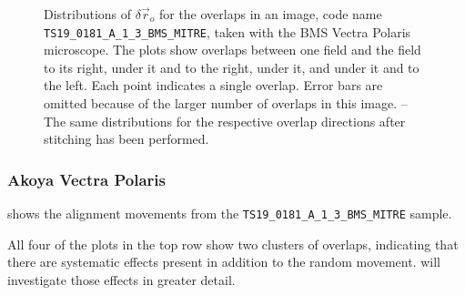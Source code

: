 \documentclass{article}
\begin{document}
\begin{figure}[ht]
\begin{subfigure}{0.24\linewidth}
		\caption{}
		\label{fig:stitchresultBMS1}
	\end{subfigure}
	\caption{Distributions of $\delta\vec{r}_o$ for the overlaps in an image, code name \texttt{TS19\_0181\_A\_1\_3\_BMS\_MITRE}, taken with the BMS Vectra Polaris microscope.  The plots show overlaps between one field and the field  to its right,  under it and to the right,  under it, and  under it and to the left.  Each point indicates a single overlap.  Error bars are omitted because of the larger number of overlaps in this image.  -- The same distributions for the respective overlap directions after stitching has been performed.}
	\label{fig:alignmentresultsBMS}
\end{figure}

\subsubsection{Akoya Vectra Polaris}

 shows the alignment movements from the \texttt{TS19\_0181\_A\_1\_3\_BMS\_MITRE} sample.

All four of the plots in the top row show two clusters of overlaps, indicating that there are systematic effects present in addition to the random movement.   will investigate those effects in greater detail.
\end{document}
